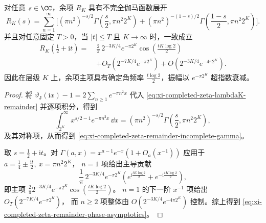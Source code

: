 \begin{theorem}[余项的相位律与首项振荡主导]\label{thm:xi-completed-zeta-remainder-phase-law}
对任意 \(s\in\CC\)，余项 \(R_K\) 具有不完全伽马函数展开
\begin{equation}\label{eq:xi-completed-zeta-remainder-incomplete-gamma}
R_K(s)=\sum_{n=1}^{\infty}\Biggl[
(\pi n^2)^{-s/2}\Gamma\!\left(\frac{s}{2},\pi n^2 2^K\right)
+
(\pi n^2)^{-(1-s)/2}\Gamma\!\left(\frac{1-s}{2},\pi n^2 2^K\right)
\Biggr].
\end{equation}
并且对任意固定 \(T>0\)，当 \(|t|\le T\) 且 \(K\to\infty\) 时，一致成立
\begin{equation}\label{eq:xi-completed-zeta-remainder-phase-asymptotics}
\begin{aligned}
R_K\!\left(\frac12+\mathrm{i}t\right)
=\;&
\frac{2}{\pi}\,2^{-3K/4}e^{-\pi 2^K}
\cos\!\left(\frac{tK\log2}{2}\right)\\
&+O_T\!\left(2^{-7K/4}e^{-\pi2^K}\right)
+O\!\left(2^{-3K/4}e^{-4\pi2^K}\right).
\end{aligned}
\end{equation}
因此在层级 \(K\) 上，余项主项具有确定角频率 \(\frac{t\log2}{2}\)，振幅以 \(e^{-\pi2^K}\) 超指数衰减。
\end{theorem}
\begin{proof}
将
\(
\vartheta_{\mathrm J}(\mathrm{i}x)-1
=2\sum_{n\ge1}e^{-\pi n^2x}
\)
代入 \eqref{eq:xi-completed-zeta-lambdaK-remainder} 并逐项积分，得到
\[
\int_{2^K}^{\infty}x^{s/2-1}e^{-\pi n^2x}\,\dd x
=(\pi n^2)^{-s/2}\Gamma\!\left(\frac{s}{2},\pi n^2 2^K\right),
\]
及其对称项，从而得到 \eqref{eq:xi-completed-zeta-remainder-incomplete-gamma}。
\par
取 \(s=\frac12+\mathrm{i}t\)。对
\(
\Gamma(a,x)=x^{a-1}e^{-x}(1+O_a(x^{-1}))
\)
应用于
\(
a=\frac14\pm\frac{\mathrm{i}t}{2},\ x=\pi n^2 2^K
\)，
\(n=1\) 项给出主导贡献
\[
\frac{1}{\pi}\,2^{-3K/4}e^{-\pi2^K}
\left(e^{\mathrm{i}\frac{tK\log2}{2}}+e^{-\mathrm{i}\frac{tK\log2}{2}}\right),
\]
即主项
\(
\frac{2}{\pi}2^{-3K/4}e^{-\pi2^K}\cos(\frac{tK\log2}{2})
\)。
\(n=1\) 的下一阶 \(x^{-1}\) 项给出
\(
O_T(2^{-7K/4}e^{-\pi2^K})
\)，
而 \(n\ge2\) 项整体由
\(
O(2^{-3K/4}e^{-4\pi2^K})
\)
控制。综上得到 \eqref{eq:xi-completed-zeta-remainder-phase-asymptotics}。
\end{proof}

